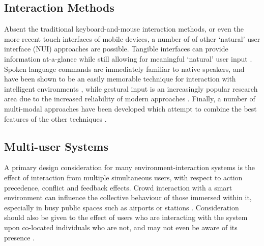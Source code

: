 \documentclass[oribibl,11pt]{llncs}
\begin{document}
\subsection{Interaction Methods}		\label{sub:interaction_methods}
Absent the traditional keyboard-and-mouse interaction methods, or even the more recent touch interfaces of mobile devices, a number of of other `natural' user interface (NUI) approaches are possible. Tangible interfaces can provide information at-a-glance while still allowing for meaningful `natural' user input \cite{Bartolini:2012:RNI:2387476.2387479}. Spoken language commands are immediately familiar to native speakers, and have been shown to be an easily memorable technique for interaction with intelligent environments \cite{Minker:2009:RSL:1735821.1735825}, while gestural input is an increasingly popular research area due to the increased reliability of modern approaches \cite{Carrino:2011:ATH:2027296.2027317,Carrino:2013:FGH:2530824.2530844}. Finally, a number of multi-modal approaches have been developed which attempt to combine the best features of the other techniques \cite{Carrino:2011:HSE:2070481.2070501,Weingarten:2010:TMI:1858171.1858255}.



\subsection{Multi-user Systems}		\label{sub:multi_user_systems}
A primary design consideration for many environment-interaction systems is the effect of interaction from multiple simultaneous users, with respect to action precedence, conflict and feedback effects. 
Crowd interaction with a smart environment can influence the collective behaviour of those immersed within it, especially in busy public spaces such as airports or stations \cite{Harrison:2009:ECI:1570433.1570456}. Consideration should also be given to the effect of users who are interacting with the system upon co-located individuals who are not, and may not even be aware of its presence \cite{Nguyen:2006:MSV:1180639.1180732}.

\end{document}

